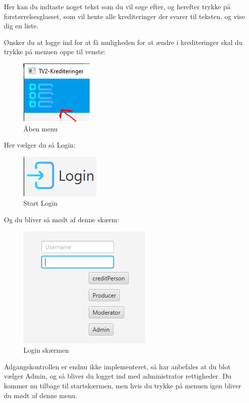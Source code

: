 Her kan du indtaste noget tekst som du vil søge efter, og herefter trykke på forstørrelsesglasset, som vil hente alle krediteringer der svarer til teksten, og vise dig en liste.

Ønsker du at logge ind for at få muligheden for at ændre i krediteringer skal du trykke på menuen oppe til venste:

\begin{figure}[H]
    \centering
    \includegraphics{images/OpenMenu.PNG}
    \caption{Åben menu}
    \label{fig:my_label}
\end{figure}

Her vælger du så Login:

\begin{figure}[H]
    \centering
    \includegraphics{images/login.PNG}
    \caption{Start Login}
    \label{fig:my_label}
\end{figure}

Og du bliver så mødt af denne skærm:

\begin{figure}[H]
    \centering
    \includegraphics{images/UserTypes.PNG}
    \caption{Login skærmen}
    \label{fig:my_label}
\end{figure}

Adgangskontrollen er endnu ikke implementeret, så har anbefales at du blot vælger Admin, og så bliver du logget ind med administrator rettigheder. Du kommer nu tilbage til startskærmen, men hvis du trykke på menuen igen bliver du mødt af denne menu.

